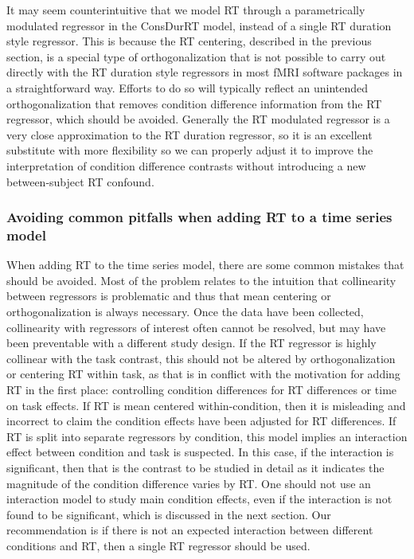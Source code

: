 \documentclass[titlepage,12pt] {article}
\begin{document}
It may seem counterintuitive that we model RT through a parametrically modulated regressor in the ConsDurRT model, instead of a single RT duration style regressor.  This is because the RT centering, described in the previous section, is a special type of orthogonalization that is not possible to carry out directly with the RT duration style regressors in most fMRI software packages in a straightforward way.  Efforts to do so will typically reflect an unintended orthogonalization that removes condition difference information from the RT regressor, which should be avoided.  Generally the RT modulated regressor is a very close approximation to the RT duration regressor, so it is an excellent substitute with more flexibility so we can properly adjust it to improve the interpretation of condition difference contrasts without introducing a new between-subject RT confound.  


\subsubsection*{Avoiding common pitfalls when adding RT to a time series model}
When adding RT to the time series model, there are some  common mistakes that should be avoided.  Most of the problem relates to the intuition that collinearity between regressors is problematic and thus that mean centering or orthogonalization is always necessary.  Once the data have been collected, collinearity with regressors of interest often cannot be resolved, but may have been preventable with a different study design.  If the RT regressor is highly collinear with the task contrast, this should not be altered by orthogonalization or centering RT within task, as that is in conflict with the motivation for adding RT in the first place: controlling condition differences for RT differences or time on task effects.  If RT is mean centered within-condition, then it is misleading and incorrect to claim the condition effects have been adjusted for RT differences.  If RT is split into separate regressors by condition, this model implies an interaction effect between condition and task is suspected.  In this case, if the interaction is significant, then that is the contrast to be studied in detail as it indicates the magnitude of the condition difference varies by  RT.  One should not use an interaction model to study main condition effects, even if the interaction is not found to be significant, which is discussed in the next section.  Our recommendation is if there is not an expected interaction between different conditions and RT, then a single RT regressor should be used.  
\end{document}
